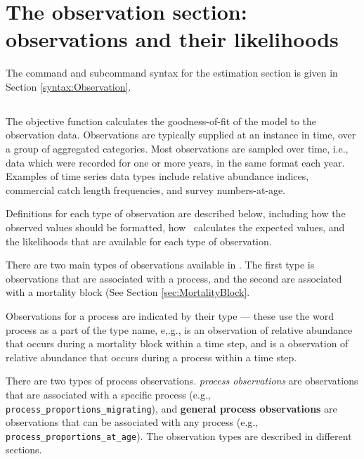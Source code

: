 \section{The observation section: observations and their likelihoods\label{sec:Observation}}

The command and subcommand syntax for the estimation section is given in Section \ref{syntax:Observation}.

\subsection{}

The objective function calculates the goodness-of-fit of the model to the observation data. Observations are typically supplied at an instance in time, over a group of aggregated categories. Most observations are sampled over time, i.e., data which were recorded for one or more years, in the same format each year. Examples of time series data types include relative abundance indices, commercial catch length frequencies, and survey numbers-at-age.

Definitions for each type of observation are described below, including how the observed values should be formatted, how \CNAME\ calculates the expected values, and the likelihoods that are available for each type of observation.

There are two main types of observations available in \CNAME. The first type is observations that are associated with a process, and the second are associated with a mortality block (See Section \ref{sec:MortalityBlock}.

Observations for a process are indicated by their type --- these use the word process as a part of the type name, e,.g.,  is an observation of relative abundance that occurs during a mortality block within a time step, and  is a observation  of relative abundance that occurs during a process within a time step.

There are two types of process observations. \emph{process observations} are observations that are associated with a specific process (e.g., \texttt{process\_proportions\_migrating}), and \textbf{general process observations} are observations that can be associated with any process (e.g., \texttt{process\_proportions\_at\_age}). The observation types are described in different sections.

\subsubsection{}


